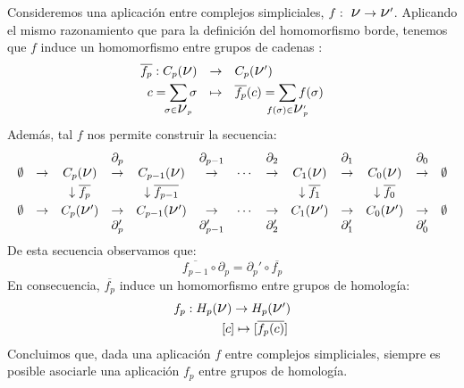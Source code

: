 \documentclass[12pt, a4paper]{article}
\numberwithin{equation}{section}
\theoremstyle{definition}
\theoremstyle{remark}
\theoremstyle{plain}
\begin{document}
	Consideremos una aplicación entre complejos simpliciales, $f:\text{
	{\Large $\nu$}}\rightarrow\text{{\Large $\nu$}}'$. Aplicando el mismo 
	razonamiento que para la definición del homomorfismo borde, tenemos 
	que $f$ induce un homomorfismo entre grupos de cadenas :
	\begin{equation}
		\label{hom:induc}
		\left.
		\begin{array}{lll}
			\overline{f_{p}}:C_{p}(\text{{\Large $\nu$}}) & 
				\rightarrow & C_{p}(\text{{\Large $\nu$}}')
				\\[3pt] 
			\multicolumn{1}{r}{c=\displaystyle \sum_{\mathclap{
			\sigma \in \text{{\Large $\nu$}$_{p}$}}}\sigma} & 
			\mapsto & 
			\overline{f_{p}}(c)=\displaystyle \sum_{\mathclap{
			f(\sigma) \in \text{{\Large $\nu$}$_{p}'$}}}f(\sigma)
		\end{array}
		\right. 
	\end{equation}
	Además, tal $f$ nos permite construir la secuencia:
	\begin{equation}
		\label{hom: gruphom}
		 \left.
		\begin{array}{ccccccccccccc}
			 & & & \partial_{p} &  & 
			\partial_{p-1} &  & \partial_{2}&  & \partial_{1}&  & 
			\partial_{0} & \\ 
			\emptyset & \rightarrow & C_{p}(
			\text{{\Large $\nu$}}) & \rightarrow & C_{p-1}(
			\text{{\Large $\nu$}}) & \rightarrow &\cdots & 
			\rightarrow & C_{1}(
			\text{{\Large $\nu$}})& \rightarrow & C_{0}(
			\text{{\Large $\nu$}})& \rightarrow & \emptyset\\[3pt]

			 & & \downarrow \overline{f_{p}}& & \downarrow 
			\overline{f_{p-1}}& 
			 & & & \downarrow \overline{f_{1}}
			 & & \downarrow \overline{f_{0}} & & \\ [3pt]
			\emptyset & \rightarrow & C_{p}(
			\text{{\Large $\nu$}}') & \rightarrow & C_{p-1}(
			\text{{\Large $\nu$}}') & \rightarrow &\cdots & 
			\rightarrow & C_{1}(
			\text{{\Large $\nu$}}')& \rightarrow & C_{0}(
			\text{{\Large $\nu$}}')& \rightarrow & \emptyset \\
			 & & & \partial_{p}' &  & 
			\partial_{p-1}' &  & \partial_{2}' &  & \partial_{1}'&
					& \partial_{0}' &
		\end{array}
		\right. 
	\end{equation}
	De esta secuencia observamos que: 
	\begin{equation*}
		\overline{f_{p-1}}\circ\partial_{p}=
		\partial_{p}'\circ\overline{f_{p}} 
	\end{equation*}
	En consecuencia, $\overline{f_{p}}$ induce un 
	homomorfismo entre grupos de homología:	
		\begin{align*}
			\left.
			\begin{array}{l}
				f_{p}:H_{p}(\text{{\Large $\nu$}})\rightarrow 
				H_{p}(\text{{\Large $\nu$}}')\\[3pt] 
				\hspace{1.35cm} [c] \mapsto [\overline{f_{p}
				(c)}]
			\end{array}
			\right.
		\end{align*}
	Concluimos que, dada una aplicación $f$ entre complejos simpliciales, 
	siempre es posible asociarle una aplicación $f_{p}$ entre grupos de 
	homología.
	
\end{document}
